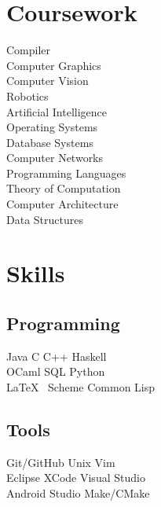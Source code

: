 \documentclass[]{deedy-resume-openfont}
\begin{document}
\begin{minipage}[t]{0.33\textwidth}

\section{Coursework}

Compiler \\
Computer Graphics \\
Computer Vision \\
Robotics \\
Artificial Intelligence \\
Operating Systems  \\
Database Systems \\
Computer Networks \\
Programming Languages \\
Theory of Computation \\
Computer Architecture \\
Data Structures \\
\sectionsep


\section{Skills}
\subsection{Programming}
Java    \textbullet{}   C    \textbullet{} C++ \textbullet{} Haskell \\
OCaml \textbullet{} SQL    \textbullet{} Python \\
\LaTeX\ \textbullet{} Scheme \textbullet{} Common Lisp \\
\sectionsep
\subsection{Tools}
Git/GitHub \textbullet{} Unix \textbullet{} Vim\\  Eclipse \textbullet{} XCode \textbullet{} Visual Studio\\
Android Studio \textbullet{} Make/CMake \\


\end{minipage}
\end{document}
